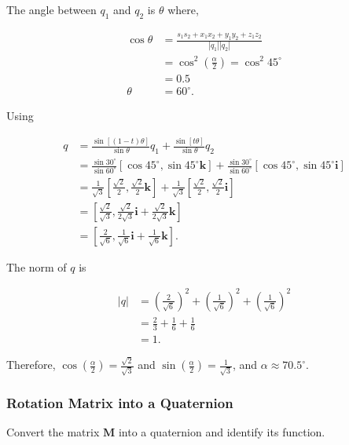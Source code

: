 \documentclass[10pt]{article}
\begin{document}
The angle between $q_{1}$ and $q_{2}$ is $\theta$ where,

$$
\begin{aligned}
\cos \theta & =\frac{s_{1} s_{2}+x_{1} x_{2}+y_{1} y_{2}+z_{1} z_{2}}{\left|q_{1}\right|\left|q_{2}\right|} \\
& =\cos ^{2}\left(\frac{\alpha}{2}\right)=\cos ^{2} 45^{\circ} \\
& =0.5 \\
\theta & =60^{\circ} .
\end{aligned}
$$

Using

$$
\begin{aligned}
q & =\frac{\sin [(1-t) \theta]}{\sin \theta} q_{1}+\frac{\sin [t \theta]}{\sin \theta} q_{2} \\
& =\frac{\sin 30^{\circ}}{\sin 60^{\circ}}\left[\cos 45^{\circ}, \sin 45^{\circ} \mathbf{k}\right]+\frac{\sin 30^{\circ}}{\sin 60^{\circ}}\left[\cos 45^{\circ}, \sin 45^{\circ} \mathbf{i}\right] \\
& =\frac{1}{\sqrt{3}}\left[\frac{\sqrt{2}}{2}, \frac{\sqrt{2}}{2} \mathbf{k}\right]+\frac{1}{\sqrt{3}}\left[\frac{\sqrt{2}}{2}, \frac{\sqrt{2}}{2} \mathbf{i}\right] \\
& =\left[\frac{\sqrt{2}}{\sqrt{3}}, \frac{\sqrt{2}}{2 \sqrt{3}} \mathbf{i}+\frac{\sqrt{2}}{2 \sqrt{3}} \mathbf{k}\right] \\
& =\left[\frac{2}{\sqrt{6}}, \frac{1}{\sqrt{6}} \mathbf{i}+\frac{1}{\sqrt{6}} \mathbf{k}\right] .
\end{aligned}
$$

The norm of $q$ is

$$
\begin{aligned}
|q| & =\left(\frac{2}{\sqrt{6}}\right)^{2}+\left(\frac{1}{\sqrt{6}}\right)^{2}+\left(\frac{1}{\sqrt{6}}\right)^{2} \\
& =\frac{2}{3}+\frac{1}{6}+\frac{1}{6} \\
& =1 .
\end{aligned}
$$

Therefore, $\cos \left(\frac{\alpha}{2}\right)=\frac{\sqrt{2}}{\sqrt{3}}$ and $\sin \left(\frac{\alpha}{2}\right)=\frac{1}{\sqrt{3}}$, and $\alpha \approx 70.5^{\circ}$.

\subsubsection{Rotation Matrix into a Quaternion}
Convert the matrix $\mathbf{M}$ into a quaternion and identify its function.
\end{document}
